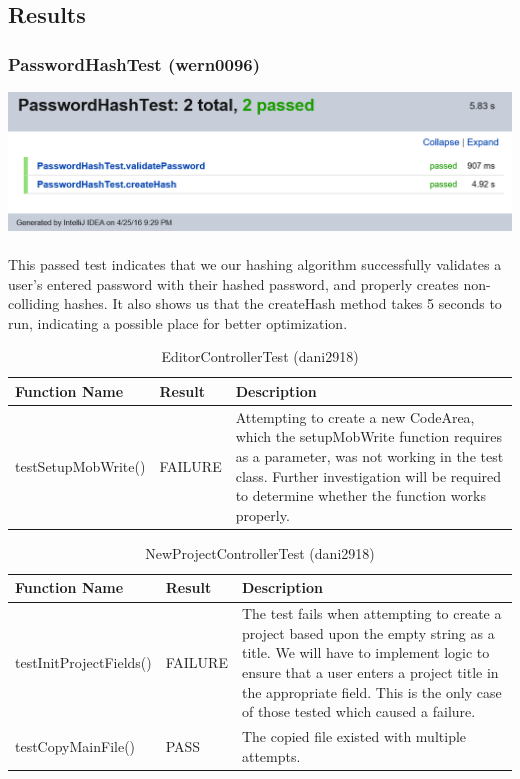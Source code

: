 \documentclass[14pt, a4paper]{article}
\begin{document}
\newpage

\subsection{Results}

\subsubsection{PasswordHashTest (wern0096)}

\includegraphics[width=\textwidth]{PasswordHashTest} \\ \\

This passed test indicates that we our hashing algorithm successfully validates a user's entered password with their hashed password, and properly creates non-colliding hashes. It also shows us that the createHash method takes 5 seconds to run, indicating a possible place for better optimization.

\begin{table}[h]
	\centering
	\caption{EditorControllerTest (dani2918)}
	\begin{tabular}{|p{3cm}|p{3cm}|p{9cm}|}
		\hline
		\textbf{Function Name} & \textbf{Result} & \textbf{Description}  \\\hline
		testSetupMobWrite() & FAILURE & Attempting to create a new CodeArea, which the setupMobWrite function requires as a parameter, was not working in the test class. Further investigation will be required to determine whether the function works properly.
		  \\\hline
	\end{tabular}
\end{table}


\begin{table}[h]
	\centering
	\caption{NewProjectControllerTest (dani2918)}
	\begin{tabular}{|p{3cm}|p{3cm}|p{9cm}|}
		\hline
		\textbf{Function Name} & \textbf{Result} & \textbf{Description}  \\\hline
		testInitProjectFields() & FAILURE & The test fails when attempting to create a project based upon the empty string as a title. We will have to implement logic to ensure that a user enters a project title in the appropriate field. This is the only case of those tested which caused a failure.
		  \\\hline
		  testCopyMainFile() & PASS & The copied file existed with multiple attempts.
		  \\\hline
	\end{tabular}
\end{table}
\end{document}
